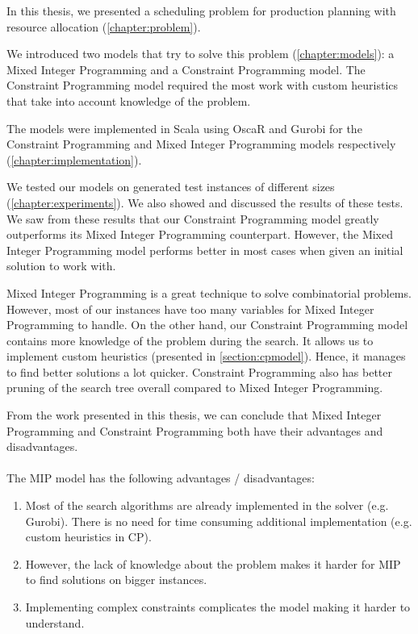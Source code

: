 \documentclass[../thesis.tex]{subfiles}
\begin{document}
In this thesis, we presented a scheduling problem for production planning 
with resource allocation (\autoref{chapter:problem}).

We introduced two models that try to solve
this problem (\autoref{chapter:models}): a Mixed Integer Programming and a Constraint Programming model.
The Constraint Programming model required the most work with custom heuristics that take into account knowledge of the problem.

The models were implemented in Scala using OscaR and Gurobi for the Constraint Programming and Mixed Integer Programming models respectively (\autoref{chapter:implementation}).

We tested our models on generated test instances of different sizes (\autoref{chapter:experiments}).
We also showed and discussed the results of these tests. We saw from these results that our Constraint Programming model greatly outperforms
its Mixed Integer Programming counterpart.
However, the Mixed Integer Programming model performs better in most cases when given an initial solution 
to work with.


Mixed Integer Programming is a great technique to solve combinatorial problems. However, most of our 
instances have too many variables for Mixed Integer Programming to handle.
On the other hand,
our Constraint Programming model contains more knowledge of the problem during the search. 
It allows us to implement custom heuristics (presented in \autoref{section:cpmodel}). Hence, it manages to find 
better solutions a lot quicker. Constraint Programming also has better pruning of the search tree overall compared to Mixed Integer Programming.


From the work presented in this thesis, we can conclude that Mixed Integer Programming and Constraint Programming both have their advantages and disadvantages.

\paragraph{}

The MIP model has the following advantages / disadvantages:
\begin{enumerate}[leftmargin=1.5cm]
  \item Most of the search algorithms are already implemented in the solver (e.g. Gurobi).
  There is no need for time consuming additional implementation (e.g. custom heuristics in CP).
  \item However, the lack of knowledge about the problem makes it harder for MIP to find solutions on bigger instances.
  \item Implementing complex constraints complicates the model making it harder to understand.
\end{enumerate}
\end{document}
